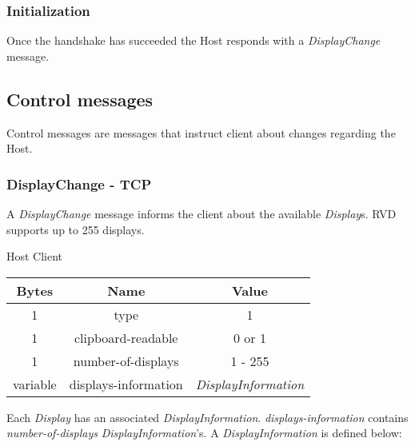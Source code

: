 \documentclass{article}
\begin{document}
    \subsubsection{Initialization}

    Once the handshake has succeeded the Host responds with a \emph{DisplayChange} message.

    \subsection{Control messages}
    Control messages are messages that instruct client about changes regarding the Host.

    \subsubsection{DisplayChange - TCP}
    A \emph{DisplayChange} message informs the client about the available \emph{Display}s. RVD supports up to 255 displays.

    \begin{center}
        Host \textrightarrow Client\\
        \begin{tabular}{|c|c|c|}
            \hline
            \textbf{Bytes} & \textbf{Name}        & \textbf{Value}            \\
            \hline
            1              & type                 & 1                         \\
            \hline
            1              & clipboard-readable   & 0 or 1                    \\
            \hline
            1              & number-of-displays   & 1 - 255                   \\
            \hline
            variable       & displays-information & \emph{DisplayInformation} \\
            \hline
        \end{tabular}
    \end{center}

    Each \emph{Display} has an associated \emph{DisplayInformation}. \emph{displays-information} contains \emph{number-of-displays} \emph{DisplayInformation}'s. A \emph{DisplayInformation} is defined below:
\end{document}
